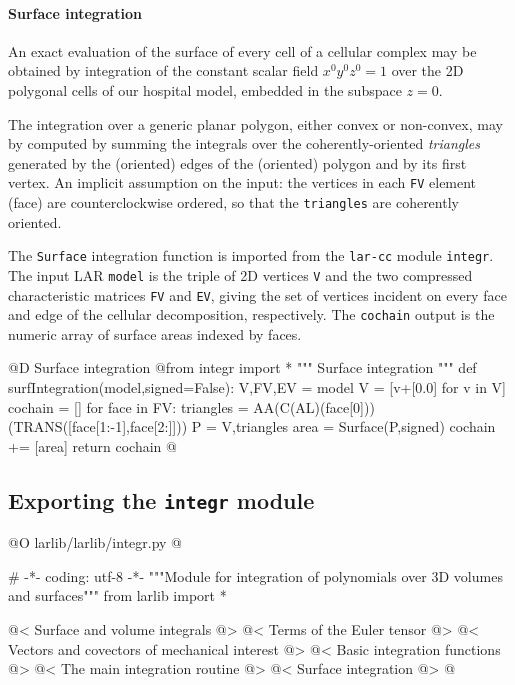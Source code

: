 \documentclass[11pt,oneside]{article}	%
\begin{document}
\paragraph{Surface integration}

An exact evaluation of the surface of every cell of a cellular complex may be obtained by integration of the constant scalar field $x^0y^0z^0 = 1$ over the 2D polygonal cells of our hospital model, embedded in the subspace $z=0$. 

The integration over a generic planar polygon, either convex or non-convex, may by computed by summing the integrals over the coherently-oriented \emph{triangles} generated by the (oriented) edges of the (oriented) polygon and by its first vertex. An implicit assumption on the input: the vertices in each \texttt{FV} element (face) are counterclockwise ordered, so that the \texttt{triangles} are coherently oriented.

The \texttt{Surface} integration function is imported from the \texttt{lar-cc} module \texttt{integr}. The input LAR \texttt{model} is the triple of 2D vertices \texttt{V} and the two compressed characteristic matrices \texttt{FV} and \texttt{EV}, giving the set of vertices incident on every face and edge of the cellular decomposition, respectively. The \texttt{cochain} output is the numeric array of surface areas indexed by faces. 

@D Surface integration
@{from integr import *
""" Surface integration """
def surfIntegration(model,signed=False):
    V,FV,EV = model
    V = [v+[0.0] for v in V]
    cochain = []
    for face in FV:
        triangles = AA(C(AL)(face[0]))(TRANS([face[1:-1],face[2:]]))
        P = V,triangles
        area = Surface(P,signed) 
        cochain += [area]
    return cochain
@}




\subsection{Exporting the \texttt{integr} module}

@O larlib/larlib/integr.py 
@{# -*- coding: utf-8 -*-
"""Module for integration of polynomials over 3D volumes and surfaces"""
from larlib import *

@< Surface and volume integrals @>
@< Terms of the Euler tensor @>
@< Vectors and covectors of mechanical interest @>
@< Basic integration functions @>
@< The main integration routine @>
@< Surface integration @>
@}
\end{document}
